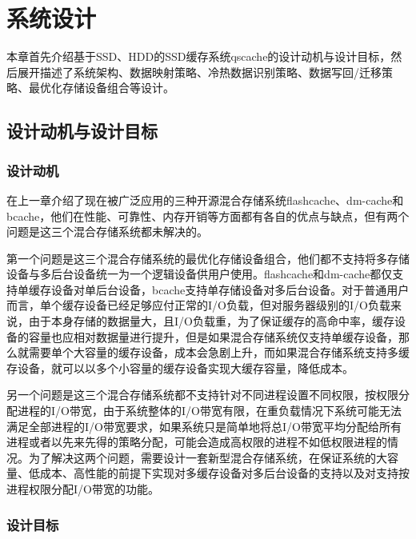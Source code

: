
\chapter{系统设计}
\label{chap:sys_design}

本章首先介绍基于SSD、HDD的SSD缓存系统qscache的设计动机与设计目标，然后展开描述了系统架构、数据映射策略、冷热数据识别策略、数据写回/迁移策略、最优化存储设备组合等设计。

\section{设计动机与设计目标}

\subsection{设计动机}

在上一章介绍了现在被广泛应用的三种开源混合存储系统flashcache、dm-cache和bcache，他们在性能、可靠性、内存开销等方面都有各自的优点与缺点，但有两个问题是这三个混合存储系统都未解决的。

第一个问题是这三个混合存储系统的最优化存储设备组合，他们都不支持将多存储设备与多后台设备统一为一个逻辑设备供用户使用。flashcache和dm-cache都仅支持单缓存设备对单后台设备，bcache支持单存储设备对多后台设备。对于普通用户而言，单个缓存设备已经足够应付正常的I/O负载，但对服务器级别的I/O负载来说，由于本身存储的数据量大，且I/O负载重，为了保证缓存的高命中率，缓存设备的容量也应相对数据量进行提升，但是如果混合存储系统仅支持单缓存设备，那么就需要单个大容量的缓存设备，成本会急剧上升，而如果混合存储系统支持多缓存设备，就可以以多个小容量的缓存设备实现大缓存容量，降低成本。

另一个问题是这三个混合存储系统都不支持针对不同进程设置不同权限，按权限分配进程的I/O带宽，由于系统整体的I/O带宽有限，在重负载情况下系统可能无法满足全部进程的I/O带宽要求，如果系统只是简单地将总I/O带宽平均分配给所有进程或者以先来先得的策略分配，可能会造成高权限的进程不如低权限进程的情况。为了解决这两个问题，需要设计一套新型混合存储系统，在保证系统的大容量、低成本、高性能的前提下实现对多缓存设备对多后台设备的支持以及对支持按进程权限分配I/O带宽的功能。

\subsection{设计目标}

